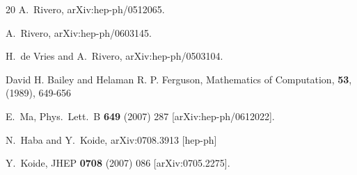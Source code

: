 \documentclass[a4paper,10pt]{article}
\begin{document}
\begin{thebibliography}{20}
  A.~Rivero,
  arXiv:hep-ph/0512065.

  A.~Rivero,
  arXiv:hep-ph/0603145.

  H.~de Vries and A.~Rivero,
  arXiv:hep-ph/0503104.


David H. Bailey and Helaman R. P. Ferguson, 
Mathematics of Computation, {\bf 53},(1989), 649-656

  E.~Ma,
  Phys.\ Lett.\  B {\bf 649} (2007) 287
  [arXiv:hep-ph/0612022].

  N.~Haba and Y.~Koide,
  arXiv:0708.3913 [hep-ph]

  Y.~Koide,
  JHEP {\bf 0708} (2007) 086
  [arXiv:0705.2275].

\end{thebibliography} 
\end{document}
